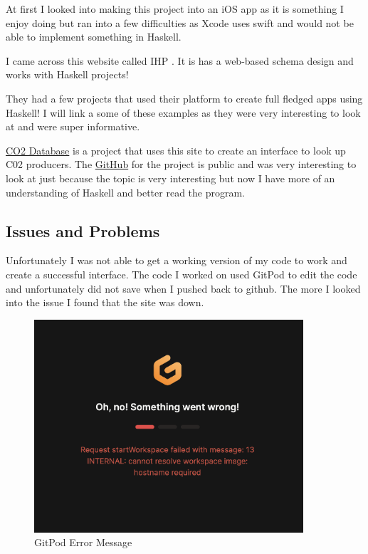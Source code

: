 \documentclass{article}
\begin{document}
\medskip\noindent
At first I looked into making this project into an iOS app as it is something I enjoy doing but ran into a few difficulties as Xcode uses swift and would not be able to implement something in Haskell. 

\medskip\noindent
I came across this website called IHP \cite{IHP}. It is has a web-based schema design and works with Haskell projects!

\medskip\noindent
They had a few projects that used their platform to create full fledged apps using Haskell! I will link a some of these examples as they were very interesting to look at and were super informative. 

\medskip\noindent
\href{https://co2db.ihpapp.com}{CO2 Database} is a project that uses this site to create an interface to look up C02 producers. The \href{https://github.com/philschonholzer/co2db}{GitHub} for the project is public and was very interesting to look at just because the topic is very interesting but now I have more of an understanding of Haskell and better read the program.

\subsection{Issues and Problems}
Unfortunately I was not able to get a working version of my code to work and create a successful interface. The code I worked on used GitPod to edit the code and unfortunately did not save when I pushed back to github. The more I looked into the issue I found that the site was down.

\medskip\noindent 
\begin{figure}[htp]
    \centering
    \includegraphics[width=10cm]{Error Message.png}
    \caption{GitPod Error Message}
    \label{fig:GitPod}
\end{figure}
\end{document}
